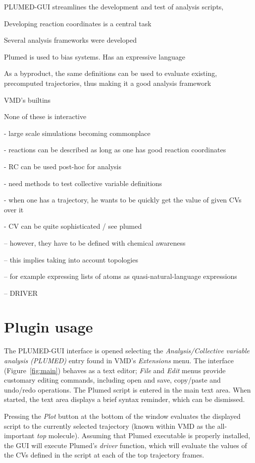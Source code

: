 \documentclass[preprint,12pt]{elsarticle}
\begin{document}
 PLUMED-GUI
  streamlines the development and test of analysis scripts, 


Developing reaction coordinates is a central task

Several analysis frameworks were developed

Plumed is used to bias systems. Has an expressive language 

As a byproduct, the same definitions can be used to evaluate
existing, precomputed trajectories, thus making it  a good analysis
framework


VMD's builtins

None of these is interactive







- large scale simulations becoming commonplace

- reactions can be described as long as one has good reaction coordinates

- RC can be used post-hoc for analysis

- need methods to test collective variable definitions

- when one has a trajectory, he wants to be quickly get the value of given CVs over it

- CV can be quite sophisticated / see plumed 

-- however, they have to be defined with chemical awareness

-- this implies taking into account topologies

-- for example expressing lists of atoms as quasi-natural-language expressions

-- DRIVER


\section{Plugin usage}

The PLUMED-GUI interface is opened selecting the
\emph{Analysis/Collective variable analysis (PLUMED)} entry found in
VMD's \emph{Extensions} menu.  The interface (Figure~\ref{fig:main})
behaves  as a text editor; \emph{File} and \emph{Edit} menus
provide  customary editing commands, including  open and save,
copy/paste and undo/redo operations.  The Plumed script is entered in the main
text area.   When started, the text area displays a
brief syntax reminder, which can be dismissed. 

Pressing the \emph{Plot} button at the bottom of the window evaluates
the displayed script to the currently selected trajectory (known
within VMD as the all-important \emph{top} molecule). Assuming that
Plumed executable is properly installed, the GUI will execute Plumed's
\emph{driver} function, which will evaluate the values of the CVs
defined in the script at each of the top trajectory frames.
\end{document}
